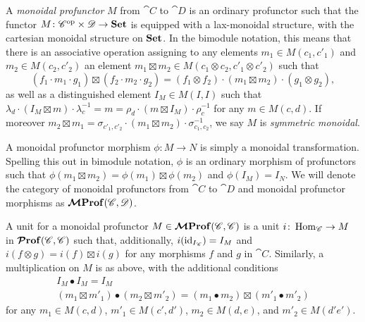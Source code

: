 \documentclass[12pt,oneside,article,draft]{memoir}
\begin{document}
A \emph{monoidal profunctor} $M$ from $\cat{C}$ to $\cat{D}$ is an ordinary profunctor such that the functor $M\colon {\mathscr{C}}^{\text{op}}\times\mathscr{D}\to\mathbf{Set}$ is equipped with a lax-monoidal structure, with the cartesian monoidal structure on $\mathbf{Set}$.
In the bimodule notation, this means that there is an associative operation assigning to any elements $m_1\in M(c_1,c'_1)$ and $m_2\in M(c_2,c'_2)$ an element $m_1\boxtimes m_2\in M(c_1\otimes c_2,c'_1\otimes c'_2)$ such that
\[
	(f_1\cdot m_1\cdot g_1)\boxtimes(f_2\cdot m_2\cdot g_2) = (f_1\otimes f_2)\cdot(m_1\boxtimes m_2)\cdot(g_1\otimes g_2),
\]
as well as a distinguished element $I_M\in M(I,I)$ such that $\lambda_d\cdot(I_M\boxtimes m)\cdot\lambda^{-1}_c = m = \rho_d\cdot(m\boxtimes I_M)\cdot\rho^{-1}_c$ for any $m\in M(c,d)$.
If moreover $m_2\boxtimes m_1 = \sigma_{c'_1,c'_2}\cdot(m_1\boxtimes m_2)\cdot\sigma_{c_1,c_2}^{-1}$, we say $M$ is \emph{symmetric monoidal}.

A monoidal profunctor morphism $\phi\colon M\to N$ is simply a monoidal transformation.
Spelling this out in bimodule notation, $\phi$ is an ordinary morphism of profunctors such that $\phi(m_1\boxtimes m_2)=\phi(m_1)\boxtimes\phi(m_2)$ and $\phi(I_M)=I_N$.
We will denote the category of monoidal profunctors from $\cat{C}$ to $\cat{D}$ and monoidal profunctor morphisms as $\bm{\mathcal{M}}\mathbf{Prof}(\mathscr{C},\mathscr{D})$.

A unit for a monoidal profunctor $M\in\bm{\mathcal{M}}\mathbf{Prof}(\mathscr{C},\mathscr{C})$ is a unit $i\colon\operatorname{Hom}_{\mathscr{C}}\to M$ in $\bm{\mathcal{P}}\mathbf{rof}(\mathscr{C},\mathscr{C})$ such that, additionally, $i(\operatorname{id}_{I_{\mathscr{C}}})=I_M$ and $i(f\otimes g)=i(f)\boxtimes i(g)$ for any morphisms $f$ and $g$ in $\cat{C}$.
Similarly, a multiplication on $M$ is as above, with the additional conditions
\begin{gather*}
	I_M\bullet I_M=I_M \\
	(m_1\boxtimes m'_1)\bullet(m_2\boxtimes m'_2) = (m_1\bullet m_2)\boxtimes(m'_1\bullet m'_2)
\end{gather*}
for any $m_1\in M(c,d)$, $m'_1\in M(c',d')$, $m_2\in M(d,e)$, and $m'_2\in M(d'e')$.

\end{document}
